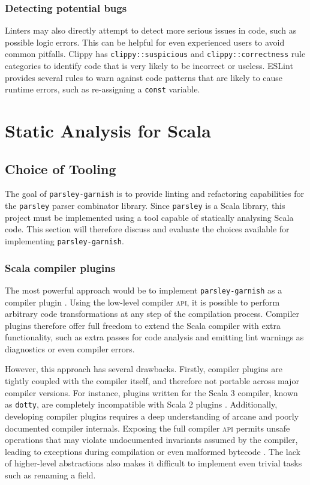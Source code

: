 \subsubsection{Detecting potential bugs}
Linters may also directly attempt to detect more serious issues in code, such as possible logic errors.
This can be helpful for even experienced users to avoid common pitfalls.
Clippy has \texttt{clippy::suspicious} and \texttt{clippy::correctness} rule categories to identify code that is very likely to be incorrect or useless.
ESLint provides several rules to warn against code patterns that are likely to cause runtime errors, such as re-assigning a \texttt{const} variable.

\section{Static Analysis for Scala}
\subsection{Choice of Tooling}
The goal of \texttt{parsley-garnish} is to provide linting and refactoring capabilities for the \texttt{parsley} parser combinator library.
Since \texttt{parsley} is a Scala library, this project must be implemented using a tool capable of statically analysing Scala code.
This section will therefore discuss and evaluate the choices available for implementing \texttt{parsley-garnish}.

\subsubsection{Scala compiler plugins}
The most powerful approach would be to implement \texttt{parsley-garnish} as a compiler plugin \cite{pickering_plugins_2019}.
Using the low-level compiler \textsc{api}, it is possible to perform arbitrary code transformations at any step of the compilation process.
Compiler plugins therefore offer full freedom to extend the Scala compiler with extra functionality, such as extra passes for code analysis and emitting lint warnings as diagnostics or even compiler errors.

However, this approach has several drawbacks.
Firstly, compiler plugins are tightly coupled with the compiler itself, and therefore not portable across major compiler versions.
For instance, plugins written for the Scala 3 compiler, known as \texttt{dotty}, are completely incompatible with Scala 2 plugins \cite{lampepfl_changes_2022}.
Additionally, developing compiler plugins requires a deep understanding of arcane and poorly documented compiler internals.
Exposing the full compiler \textsc{api} permits unsafe operations that may violate undocumented invariants assumed by the compiler, leading to exceptions during compilation or even malformed bytecode \cite{sherwany_refactoring_2015}.
The lack of higher-level abstractions also makes it difficult to implement even trivial tasks such as renaming a field.

